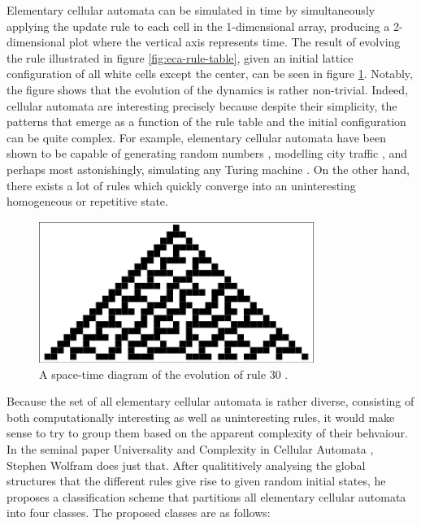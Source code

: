 \documentclass[12pt]{article}
\begin{document}
Elementary cellular automata can be simulated in time by simultaneously applying the update rule to each cell in the 1-dimensional array, producing a 2-dimensional plot where the vertical axis represents time. The result of evolving the rule illustrated in figure \ref{fig:eca-rule-table}, given an initial lattice configuration of all white cells except the center, can be seen in figure \ref{fig:eca-rule-dynamics}. Notably, the figure shows that the evolution of the dynamics is rather non-trivial. Indeed, cellular automata are interesting precisely because despite their simplicity, the patterns that emerge as a function of the rule table and the initial configuration can be quite complex. For example, elementary cellular automata have been shown to be capable of generating random numbers \cite{eca-random-gen}, modelling city traffic \cite{eca-city-traffic}, and perhaps most astonishingly, simulating any Turing machine \cite{eca-universal}. On the other hand, there exists a lot of rules which quickly converge into an uninteresting homogeneous or repetitive state. 

\begin{figure} [!h]
\begin{center}
\includegraphics[width=0.8\textwidth]{eca-dynamics-example}
\caption{A space-time diagram of the evolution of rule 30 \cite{weisstein-eca}.}
\label{fig:eca-rule-dynamics}
\end{center}
\end{figure} 

Because the set of all elementary cellular automata is rather diverse, consisting of both computationally interesting as well as uninteresting rules, it would make sense to try to group them based on the apparent complexity of their behvaiour. In the seminal paper Universality and Complexity in Cellular Automata \cite{wolfram-classification}, Stephen Wolfram does just that. After qualititively analysing the global structures that the different rules give rise to given random initial states, he proposes a classification scheme that partitions all elementary cellular automata into four classes. The proposed classes are as follows:
\end{document}
